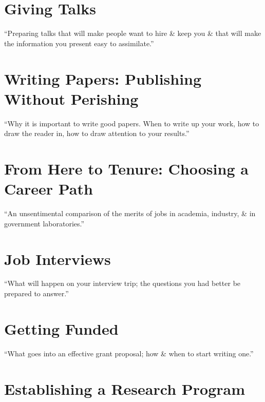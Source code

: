 \documentclass[oneside]{book}
\numberwithin{equation}{section}
\begin{document}
\section{Giving Talks}

\begin{flushright}
	``Preparing talks that will make people want to hire \& keep you \& that will make the information you present easy to assimilate.''
\end{flushright}

\section{Writing Papers: Publishing Without Perishing}

\begin{flushright}
	``Why it is important to write good papers. When to write up your work, how to draw the reader in, how to draw attention to your results.''
\end{flushright}

\section{From Here to Tenure: Choosing a Career Path}

\begin{flushright}
	``An unsentimental comparison of the merits of jobs in academia, industry, \& in government laboratories.''
\end{flushright}

\section{Job Interviews}

\begin{flushright}
	``What will happen on your interview trip; the questions you had better be prepared to answer.''
\end{flushright}

\section{Getting Funded}

\begin{flushright}
	``What goes into an effective grant proposal; how \& when to start writing one.''
\end{flushright}

\section{Establishing a Research Program}
\end{document}
